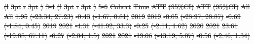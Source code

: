 \documentclass[
  letterpaper,
  DIV=11,
  numbers=noendperiod]{scrartcl}
\providecommand{\DIFdeltex}[1]{{\protect\color{red}\sout{#1}}}                      %
\providecommand{\DIFdelFL}[1]{\DIFdel{#1}} %
\providecommand{\DIFdel}[1]{\texorpdfstring{\DIFdeltex{#1}}{}} %
\begin{document}
\DIFdelFL{(l}%
\DIFdelFL{3pt}%
\DIFdelFL{r}%
\DIFdelFL{3pt}%
\DIFdelFL{)}%
\DIFdelFL{3-4}%
\DIFdelFL{(l}%
\DIFdelFL{3pt}%
\DIFdelFL{r}%
\DIFdelFL{3pt}%
\DIFdelFL{)}%
\DIFdelFL{5-6}%
\DIFdelFL{Cohort }%
\DIFdelFL{Time }%
\DIFdelFL{ATT }%
\DIFdelFL{(95\%CI) }%
\DIFdelFL{ATT }%
\DIFdelFL{(95\%CI)}%
\DIFdelFL{All }%
\DIFdelFL{All }%
\DIFdelFL{1.95 }%
\DIFdelFL{(-23.34, 27.23) }%
\DIFdelFL{-0.43 }%
\DIFdelFL{(-1.67, 0.81)}%
\DIFdelFL{2019 }%
\DIFdelFL{2019 }%
\DIFdelFL{-0.05 }%
\DIFdelFL{(-28.97, 28.87) }%
\DIFdelFL{-0.69 }%
\DIFdelFL{(-1.84, 0.45)}%
\DIFdelFL{2019 }%
\DIFdelFL{2021 }%
\DIFdelFL{-4.31 }%
\DIFdelFL{(-41.92, 33.3) }%
\DIFdelFL{-0.25 }%
\DIFdelFL{(-2.11, 1.62)}%
\DIFdelFL{2020 }%
\DIFdelFL{2021 }%
\DIFdelFL{23.61 }%
\DIFdelFL{(-19.88, 67.11) }%
\DIFdelFL{-0.27 }%
\DIFdelFL{(-2.04, 1.5)}%
\DIFdelFL{2021 }%
\DIFdelFL{2021 }%
\DIFdelFL{-19.06 }%
\DIFdelFL{(-43.19, 5.07) }%
\DIFdelFL{-0.56 }%
\DIFdelFL{(-2.46, 1.34)}%
\end{document}
